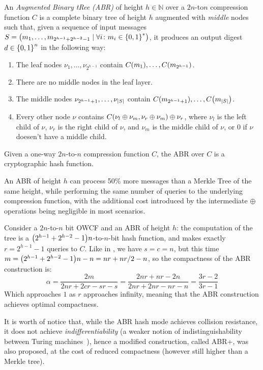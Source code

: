 \begin{definition}
	An \emph{Augmented Binary tRee (ABR)} of height \(h \in \mathbb{N}\) over a 
	\(2n\)-to\(n\) compression function \(C\) is a complete binary tree of height \(h\) 
	augmented with \emph{middle} nodes such that, given a sequence of input messages
	\(S = \left(m_1, \dots, m_{2^{h-1} + 2^{h-2}-1} \mid \forall i\colon m_i \in \left\{0, 1\right\}^{*}\right)\), 
	it produces an output digest \(d \in \left\{0, 1\right\}^n\) in the following way:
	\begin{enumerate}
		\item The leaf nodes \(\nu_{1}, \dots, \nu_{2^{h-1}}\) contain \(\call{C}{m_1}, \dots,
		      \call{C}{m_{2^{h-1}}}\).
		\item There are no middle nodes in the leaf layer.
		\item The middle nodes \(\nu_{2^{h-1}+1}, \dots, \nu_{\left\lvert S\right\rvert}\) contain
		      \(\call{C}{m_{2^{h-1}+1}}, \dots, \call{C}{m_{\abs{S}}}\).
		\item Every other node \(\nu \) contains \(\call{C}{\nu_l \oplus \nu_m, \nu_r \oplus
		      \nu_m} \oplus \nu_r \), where \(\nu_l\) is the left child of \(\nu \), \(\nu_r\)
		      is the right child of \(\nu \), and \(\nu_m\) is the middle child of \(\nu \), or \(0\)
		      if \(\nu \) doesen't have a middle child.
	\end{enumerate}
\end{definition}

\begin{proposition}
	Given a one-way \(2n\)-to-\(n\) compression function \(C\), the ABR over \(C\) is a cryptographic 
	hash function.
\end{proposition}

An ABR of height \(h\) can process 50\% more messages than a Merkle Tree of the same height, 
while performing the same number of queries to the underlying compression function, with the 
additional cost introduced by the intermediate \(\oplus \) operations being negligible in most 
scenarios.

\begin{example}
	Consider a \(2n\)-to-\(n\) bit OWCF and an ABR of height \(h\): the computation 
	of the tree is a \(\Parens*{2^{h-1} + 2^{h-2}-1}n\)-to-\(n\)-bit hash function, 
	and makes exactly \(r = 2^{h-1} - 1\) queries to \(C\).
	Like in , we have \(s = c = n\), but this time 
	\(m = \Parens*{2^{h-1} + 2^{h-2}-1}n - n = nr + {nr}/2 - n\), so the compactness of the ABR 
	construction is:
	\[
		\alpha = \frac{2m}{2nr + 2cr - sr - s} = 
		\frac{2nr + nr - 2n}{2nr + 2nr - nr - n} =
		\frac{3r - 2}{3r - 1}
	\]
	Which approaches \(1\) as \(r\) approaches infinity, meaning that the ABR construction achieves
	optimal compactness.
\end{example}

It is worth of notice that, while the ABR hash mode achieves collision resistance, it does not 
achieve \emph{indifferentiability} (a weaker notion of indistinguishability between Turing 
machines~\cite{MaurerRH2003}), hence a modified construction, called ABR+, was also proposed, at 
the cost of reduced compactness (however still higher than a Merkle tree).
